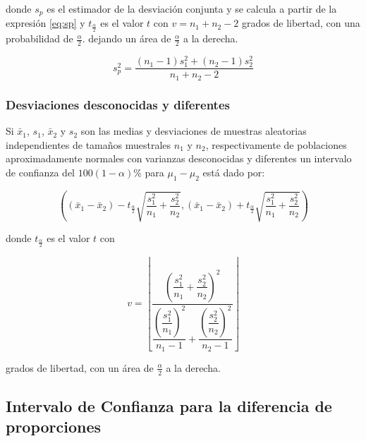 \documentclass[letterpaper,]{book}
\begin{document}
donde \(s_p\) es el estimador de la desviación conjunta y se calcula a partir de la expresión \eqref{eq:sp} y \(t_{\frac{\alpha}{2}}\) es el valor \(t\) con \(v=n_1+n_2-2\) grados de libertad, con una probabilidad de \(\frac{\alpha}{2}\). dejando un área de \(\frac{\alpha}{2}\) a la derecha.

\begin{equation} 
s_p^2 = \dfrac{\left(n_1 - 1 \right)s_1^2+\left(n_2 - 1 \right)s_2^2}{n_1 +n_2 -2} 
\label{eq:sp}
\end{equation}

\hypertarget{desviaciones-desconocidas-y-diferentes}{%
\subsubsection{Desviaciones desconocidas y diferentes}\label{desviaciones-desconocidas-y-diferentes}}

Si \(\bar{x}_1\), \(s_1\), \(\bar{x}_2\) y \(s_2\) son las medias y desviaciones de muestras aleatorias independientes de tamaños muestrales \(n_1\) y \(n_2\), respectivamente de poblaciones aproximadamente normales con varianzas desconocidas y diferentes un intervalo de confianza del \(100\left(1-\alpha \right)\%\) para \(\mu_1 - \mu_2\) está dado por:

\begin{equation} 
\left( \left( \bar{x}_1 - \bar{x}_2 \right) - t_{\frac{\alpha}{2}}\sqrt{\dfrac{s_1^2}{n_1} + \dfrac{s_2^2}{n_2}} , \left( \bar{x}_1 - \bar{x}_2 \right) + t_{\frac{\alpha}{2}}\sqrt{\dfrac{s_1^2}{n_1} + \dfrac{s_2^2}{n_2}} \right) 
\label{eq:ic2msdd}
\end{equation}

donde \(t_{\frac{\alpha}{2}}\) es el valor \(t\) con

\begin{equation} 
v = \left\lfloor\dfrac{\left(\dfrac{s_1^2}{n_1} + \dfrac{s_2^2}{n_2} \right)^2}{\dfrac{\left( \dfrac{s_1^2}{n_1} \right)^2}{n_1-1}+\dfrac{\left( \dfrac{s_2^2}{n_2} \right)^2}{n_2-1}}\right\rfloor
\label{eq:dfsdd}
\end{equation}

grados de libertad, con un área de \(\frac{\alpha}{2}\) a la derecha.

\hypertarget{intervalo-de-confianza-para-la-diferencia-de-proporciones}{%
\subsection{Intervalo de Confianza para la diferencia de proporciones}\label{intervalo-de-confianza-para-la-diferencia-de-proporciones}}
\end{document}
